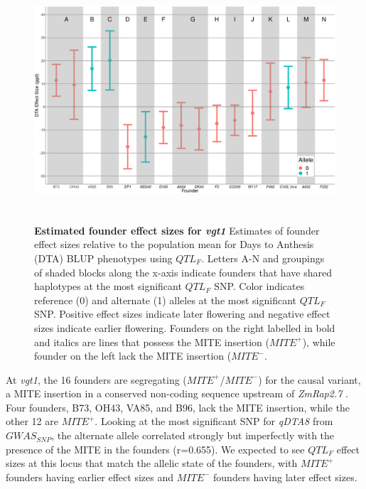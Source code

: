 \documentclass[article,9pt,twocolumn,twoside]{rilabRxiv}
\begin{document}
\begin{figure}[ht!]
\centering
\includegraphics[width=16cm,height=9cm]{figures/vgt1_Figure4.png}
\caption{\textbf{Estimated founder effect sizes for \emph{vgt1}} Estimates of founder effect sizes relative to the population mean for Days to Anthesis (DTA) BLUP phenotypes using $QTL_F$. Letters A-N and groupings of shaded blocks along the x-axis indicate founders that have shared haplotypes at the most significant $QTL_F$ SNP. Color indicates reference (0) and alternate (1) alleles at the most significant $QTL_F$ SNP. Positive effect sizes indicate later flowering and negative effect sizes indicate earlier flowering. Founders on the right labelled in bold and italics are lines that possess the MITE insertion ($MITE^+$), while founder on the left lack the MITE insertion ($MITE^-$.}
\label{fig:foundervgt1figure}
\end{figure}
At \emph{vgt1}, the 16 founders are segregating ($MITE^+$/$MITE^-$) for the causal variant, a MITE insertion in a conserved non-coding sequence upstream of \emph{ZmRap2.7} \citep{Salvi,Castelletti}.
Four founders, B73, OH43, VA85, and B96, lack the MITE insertion, while the other 12 are $MITE^+$.
Looking at the most significant SNP for \emph{qDTA8} from $GWAS_{SNP}$, the alternate allele correlated strongly but imperfectly with the presence of the MITE in the founders (r=0.655).
We expected to see $QTL_F$ effect sizes at this locus that match the allelic state of the founders, with $MITE^+$ founders having earlier effect sizes and $MITE^-$ founders having later effect sizes.
\end{document}
